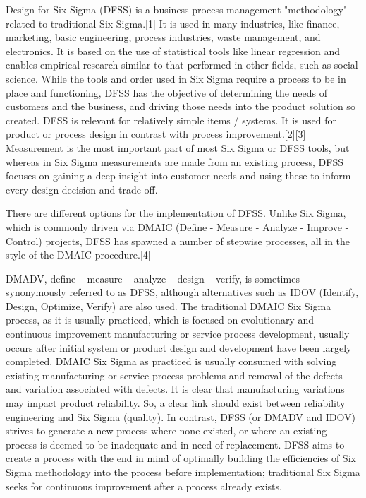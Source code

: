 Design for Six Sigma (DFSS) is a business-process management "methodology" related to traditional Six Sigma.[1] It is used in many industries, like finance, marketing, basic engineering, process industries, waste management, and electronics. It is based on the use of statistical tools like linear regression and enables empirical research similar to that performed in other fields, such as social science. While the tools and order used in Six Sigma require a process to be in place and functioning, DFSS has the objective of determining the needs of customers and the business, and driving those needs into the product solution so created. DFSS is relevant for relatively simple items / systems. It is used for product or process design in contrast with process improvement.[2][3] Measurement is the most important part of most Six Sigma or DFSS tools, but whereas in Six Sigma measurements are made from an existing process, DFSS focuses on gaining a deep insight into customer needs and using these to inform every design decision and trade-off.

There are different options for the implementation of DFSS. Unlike Six Sigma, which is commonly driven via DMAIC (Define - Measure - Analyze - Improve - Control) projects, DFSS has spawned a number of stepwise processes, all in the style of the DMAIC procedure.[4]

DMADV, define – measure – analyze – design – verify, is sometimes synonymously referred to as DFSS, although alternatives such as IDOV (Identify, Design, Optimize, Verify) are also used. The traditional DMAIC Six Sigma process, as it is usually practiced, which is focused on evolutionary and continuous improvement manufacturing or service process development, usually occurs after initial system or product design and development have been largely completed. DMAIC Six Sigma as practiced is usually consumed with solving existing manufacturing or service process problems and removal of the defects and variation associated with defects. It is clear that manufacturing variations may impact product reliability. So, a clear link should exist between reliability engineering and Six Sigma (quality). In contrast, DFSS (or DMADV and IDOV) strives to generate a new process where none existed, or where an existing process is deemed to be inadequate and in need of replacement. DFSS aims to create a process with the end in mind of optimally building the efficiencies of Six Sigma methodology into the process before implementation; traditional Six Sigma seeks for continuous improvement after a process already exists.
